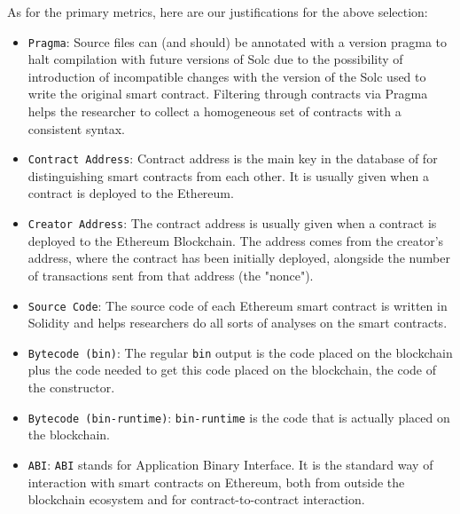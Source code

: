     As for the primary metrics, here are our justifications for the above selection:

    \begin{itemize}

        \item{\verb|Pragma|: Source files can (and should) be annotated with a version pragma to halt compilation with future versions of Solc due to the possibility of introduction of incompatible changes with the version of the Solc used to write the original smart contract. Filtering through contracts via Pragma helps the researcher to collect a homogeneous set of contracts with a consistent syntax.}\\

        \item{\verb|Contract Address|: Contract address is the main key in the database of \etherbase for distinguishing smart contracts from each other.
        It is usually given when a contract is deployed to the Ethereum.}\\

        \item{\verb|Creator Address|: The contract address is usually given when a contract is deployed to the Ethereum Blockchain.
        The address comes from the creator's address, where the contract has been initially deployed, alongside the number of transactions sent from that address (the "nonce").~\cite{ethdocs}}\\

        \item{\verb|Source Code|: The source code of each Ethereum smart contract is written in Solidity and helps researchers do all sorts of analyses on the smart contracts.}\\

        \item{\verb|Bytecode (bin)|: The regular \verb|bin| output is the code placed on the blockchain plus the code needed to get this code placed on the blockchain, the code of the constructor.}\\

        \item{\verb|Bytecode (bin-runtime)|: \verb|bin-runtime| is the code that is actually placed on the blockchain.}\\

        \item{\verb|ABI|: \verb|ABI| stands for Application Binary Interface.
        It is the standard way of interaction with smart contracts on Ethereum,
        both from outside the blockchain ecosystem and for contract-to-contract interaction.~\cite{soliditydocs}}\\


\end{itemize}
